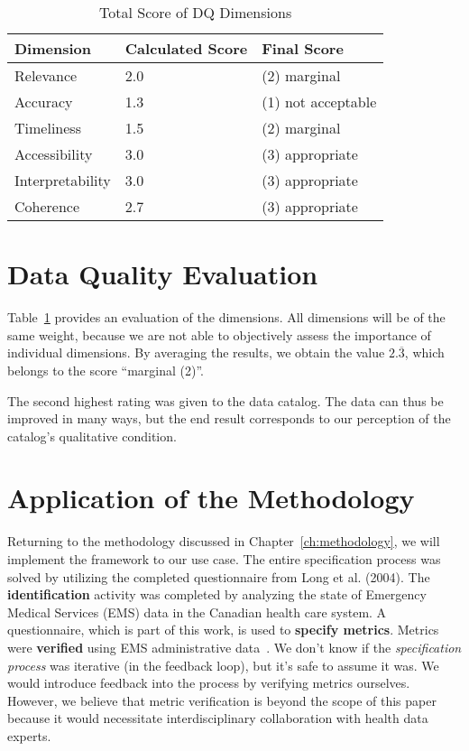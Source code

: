 \begin{table}[htbp]
    \centering

    \begin{tabular}{lll}
        \toprule
        Dimension           & Calculated Score  & Final Score           \\ \midrule
        Relevance           & 2.0               & (2) marginal          \\
        Accuracy            & 1.3               & (1) not acceptable    \\
        Timeliness          & 1.5               & (2) marginal          \\
        Accessibility       & 3.0               & (3) appropriate       \\
        Interpretability    & 3.0               & (3) appropriate       \\
        Coherence           & 2.7               & (3) appropriate       \\
            
        \bottomrule
    \end{tabular}

    \caption{Total Score of DQ Dimensions}
    \label{table:dimensions-score}
\end{table}
\FloatBarrier

\section{Data Quality Evaluation}

Table~\ref{table:dimensions-score} provides an evaluation of the dimensions.
All dimensions will be of the same weight, because we are not able to objectively assess the importance of individual dimensions.
By averaging the results, we obtain the value \( 2.\overline{3} \), which belongs to the score \enquote{marginal (2)}.

The second highest rating was given to the data catalog.
The data can thus be improved in many ways, but the end result corresponds to our perception of the catalog's qualitative condition.

\section{Application of the Methodology}

Returning to the methodology discussed in Chapter~\ref{ch:methodology}, we will implement the framework to our use case.
The entire specification process was solved by utilizing the completed questionnaire from Long et al. (2004).
The \textbf{identification} activity was completed by analyzing the state of Emergency Medical Services (EMS) data in the Canadian health care system.
A questionnaire, which is part of this work, is used to \textbf{specify metrics}.
Metrics were \textbf{verified} using EMS administrative data~\cite{long2004}.
We don't know if the \textit{specification process} was iterative (in the feedback loop), but it's safe to assume it was.
We would introduce feedback into the process by verifying metrics ourselves.
However, we believe that metric verification is beyond the scope of this paper because it would necessitate interdisciplinary collaboration with health data experts.

